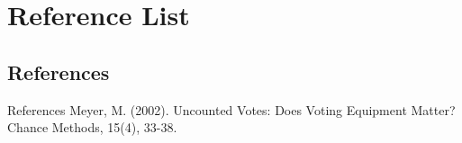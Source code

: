 \documentclass{beamer}
\begin{document}
\section{Reference List}
\subsection{References}

\begin{frame}{References}
  \leftskip 0.1in
  \parindent -0.1in
  Meyer, M. (2002). Uncounted Votes: Does Voting Equipment Matter? Chance Methods, 15(4), 33-38.
\end{frame}
\end{document}
